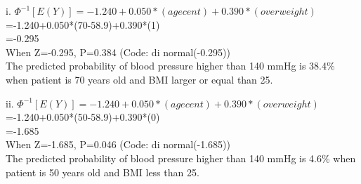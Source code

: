 \documentclass{article}
\begin{document}
i. $\Phi^{-1}[E(Y)]=-1.240+0.050*(agecent)+0.390*(overweight)$ \\
=-1.240+0.050*(70-58.9)+0.390*(1) \\
=-0.295 \\
When Z=-0.295, P=0.384 (Code: di normal(-0.295)) \\
The predicted probability of blood pressure higher than 140 mmHg is 38.4\% when patient is 70 years old and BMI larger or equal than 25.

ii. $\Phi^{-1}[E(Y)]=-1.240+0.050*(agecent)+0.390*(overweight)$ \\
=-1.240+0.050*(50-58.9)+0.390*(0) \\
=-1.685 \\
When Z=-1.685, P=0.046 (Code: di normal(-1.685)) \\
The predicted probability of blood pressure higher than 140 mmHg is 4.6\% when patient is 50 years old and BMI less than 25.
\end{document}
